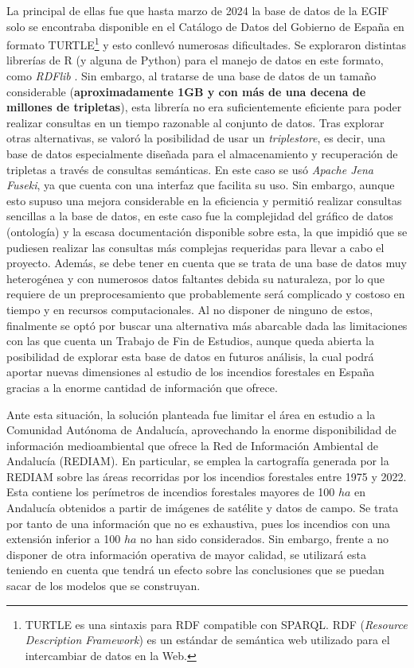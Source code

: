 \documentclass[12pt,a4paper,]{book}
\let\rmarkdownfootnote\footnote%
\def\footnote{\protect\rmarkdownfootnote}
\numberwithin{dummy}{section}
\theoremstyle{ocrenumbox}
\theoremstyle{blacknumex}
\theoremstyle{blacknumbox}
\theoremstyle{ocrenum}
\theoremstyle{ocrenum}
\begin{document}
La principal de ellas fue que hasta marzo de 2024 la base de datos de la
EGIF solo se encontraba disponible en el Catálogo de Datos del Gobierno
de España en formato TURTLE\footnote{TURTLE es una sintaxis para RDF
  compatible con SPARQL. RDF (\emph{Resource Description Framework}) es
  un estándar de semántica web utilizado para el intercambiar de datos
  en la Web.} y esto conllevó numerosas dificultades. Se exploraron
distintas librerías de R (y alguna de Python) para el manejo de datos en
este formato, como \emph{RDFlib} \citep{rdflib}. Sin embargo, al
tratarse de una base de datos de un tamaño considerable
(\textbf{aproximadamente 1GB y con más de una decena de millones de
tripletas}), esta librería no era suficientemente eficiente para poder
realizar consultas en un tiempo razonable al conjunto de datos. Tras
explorar otras alternativas, se valoró la posibilidad de usar un
\emph{triplestore}, es decir, una base de datos especialmente diseñada
para el almacenamiento y recuperación de tripletas a través de consultas
semánticas. En este caso se usó \emph{Apache Jena Fuseki}, ya que cuenta
con una interfaz que facilita su uso. Sin embargo, aunque esto supuso
una mejora considerable en la eficiencia y permitió realizar consultas
sencillas a la base de datos, en este caso fue la complejidad del
gráfico de datos (ontología) y la escasa documentación disponible sobre
esta, la que impidió que se pudiesen realizar las consultas más
complejas requeridas para llevar a cabo el proyecto. Además, se debe
tener en cuenta que se trata de una base de datos muy heterogénea y con
numerosos datos faltantes debida su naturaleza, por lo que requiere de
un preprocesamiento que probablemente será complicado y costoso en
tiempo y en recursos computacionales. Al no disponer de ninguno de
estos, finalmente se optó por buscar una alternativa más abarcable dada
las limitaciones con las que cuenta un Trabajo de Fin de Estudios,
aunque queda abierta la posibilidad de explorar esta base de datos en
futuros análisis, la cual podrá aportar nuevas dimensiones al estudio de
los incendios forestales en España gracias a la enorme cantidad de
información que ofrece.

Ante esta situación, la solución planteada fue limitar el área en
estudio a la Comunidad Autónoma de Andalucía, aprovechando la enorme
disponibilidad de información medioambiental que ofrece la Red de
Información Ambiental de Andalucía (REDIAM). En particular, se emplea la
cartografía generada por la REDIAM sobre las áreas recorridas por los
incendios forestales entre 1975 y 2022. Esta contiene los perímetros de
incendios forestales mayores de 100 \(ha\) en Andalucía obtenidos a
partir de imágenes de satélite y datos de campo. Se trata por tanto de
una información que no es exhaustiva, pues los incendios con una
extensión inferior a 100 \(ha\) no han sido considerados. Sin embargo,
frente a no disponer de otra información operativa de mayor calidad, se
utilizará esta teniendo en cuenta que tendrá un efecto sobre las
conclusiones que se puedan sacar de los modelos que se construyan.
\end{document}
